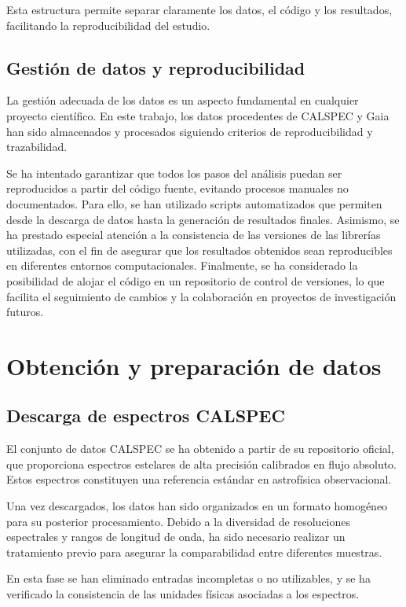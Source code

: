 \documentclass{article}
\begin{document}
Esta estructura permite separar claramente los datos, el código y los resultados, facilitando la reproducibilidad del estudio.

\subsection{Gestión de datos y reproducibilidad}

La gestión adecuada de los datos es un aspecto fundamental en cualquier proyecto científico. En este trabajo, los datos procedentes de CALSPEC y Gaia han sido almacenados y procesados siguiendo criterios de reproducibilidad y trazabilidad.

Se ha intentado garantizar que todos los pasos del análisis puedan ser reproducidos a partir del código fuente, evitando procesos manuales no documentados. Para ello, se han utilizado scripts automatizados que permiten desde la descarga de datos hasta la generación de resultados finales. Asimismo, se ha prestado especial atención a la consistencia de las versiones de las librerías utilizadas, con el fin de asegurar que los resultados obtenidos sean reproducibles en diferentes entornos computacionales. Finalmente, se ha considerado la posibilidad de alojar el código en un repositorio de control de versiones, lo que facilita el seguimiento de cambios y la colaboración en proyectos de investigación futuros.


\newpage
\section{Obtención y preparación de datos}

\subsection{Descarga de espectros CALSPEC}

El conjunto de datos CALSPEC se ha obtenido a partir de su repositorio oficial, que proporciona espectros estelares de alta precisión calibrados en flujo absoluto. Estos espectros constituyen una referencia estándar en astrofísica observacional.

Una vez descargados, los datos han sido organizados en un formato homogéneo para su posterior procesamiento. Debido a la diversidad de resoluciones espectrales y rangos de longitud de onda, ha sido necesario realizar un tratamiento previo para asegurar la comparabilidad entre diferentes muestras.

En esta fase se han eliminado entradas incompletas o no utilizables, y se ha verificado la consistencia de las unidades físicas asociadas a los espectros.
\end{document}
